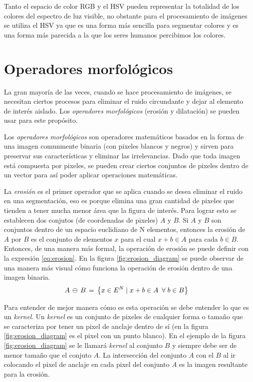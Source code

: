 Tanto el espacio de color RGB y el HSV pueden representar la totalidad de los colores del espectro de luz visible, no obstante para el procesamiento de imágenes se utiliza el HSV ya que es una forma más sencilla para segmentar colores y es una forma más parecida a la que los seres humanos percibimos los colores.

	\section{Operadores morfológicos}	
La gran mayoría de las veces, cuando se hace procesamiento de imágenes, se necesitan ciertos procesos para eliminar el ruido circundante y dejar al elemento de interés aislado. Los \textit{operadores morfológicos} (erosión y dilatación) se pueden usar para este propósito.

Los \textit{operadores morfológicos} son operadores matemáticos basados en la forma de una imagen comunmente binaria (con pixeles blancos y negros) y sirven para preservar sus características y eliminar las irrelevancias. Dado que toda imagen está compuesta por pixeles, se pueden crear ciertos conjuntos de pixeles dentro de un vector para así poder aplicar operaciones matemáticas. 

La \textit{erosión} es el primer operador que se aplica cuando se desea eliminar el ruido en una segmentación, eso es porque elimina una gran cantidad de pixeles que tienden a tener mucha menor área que la figura de interés. Para lograr esto se establecen dos conjutos (de coordenadas de pixeles) $A$ y $B$. Si $A$ y $B$ son conjuntos dentro de un espacio euclidiano de N elementos, entonces la erosión de $A$ por $B$ es el conjunto de elementos $x$ para el cual $x + b \in  A$ para cada $b \in B$. Entonces, de una manera más formal, la operación de erosión se puede definir con la expresión \ref{eq:erosion}.
En la figura \ref{fig:erosion_diagram} se puede observar de una manera más visual cómo funciona la operación de erosión dentro de una imagen binaria.
\begin{equation}
A\thinspace\ominus\thinspace B\thinspace=\thinspace \left \{ x \in E^N  \mid x+b \in A \enspace \forall \; b \in B\right \}
\label{eq:erosion}
\end{equation}

 Para entender de mejor manera cómo es esta operación se debe entender lo que es un \textit{kernel}. Un \textit{kernel} es un conjunto de pixeles de cualquier forma o tamaño que se caracteriza por tener un pixel de anclaje dentro de sí (en la figura \ref{fig:erosion_diagram} es el pixel con un punto blanco). En el ejemplo de la figura \ref{fig:erosion_diagram} se le llamará \textit{kernel} al conjunto $B$ y siempre debe ser de menor tamaño que el conjuto $A$. La intersección del conjunto $A$ con el $B$ al ir colocando el pixel de anclaje en cada pixel del conjunto $A$ es la imagen resultante para la erosión.
 
